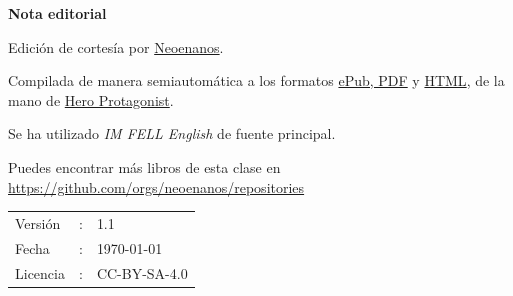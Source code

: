 \begin{center}
  {\LARGE\textbf{Nota editorial}}
\end{center}

\bigskip

Edición de cortesía por \href{https://github.com/orgs/neoenanos/}{Neoenanos}.

\medskip

Compilada de manera semiautomática a los formatos \href{https://github.com/neoenanos/elella/releases}{ePub, PDF} y \href{https://elella.netlify.app}{HTML}, de la mano de \href{https://heroprotagonist.is-a.dev/}{Hero Protagonist}.

\medskip

Se ha utilizado {\it IM FELL English} de fuente principal.

\medskip

Puedes encontrar más libros de esta clase en\\
\url{https://github.com/orgs/neoenanos/repositories}

\vfill

\begin{tabular}{l l l}
Versión   & : & 1.1 \\
Fecha     & : & \today \\
Licencia  & : & CC-BY-SA-4.0 \\
\end{tabular}

\bigskip

